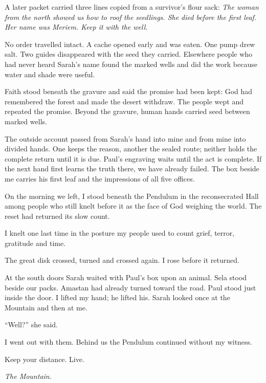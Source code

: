 A later packet carried three lines copied from a survivor's flour sack: \emph{The woman from the north showed us how to roof the seedlings. She died before the first leaf. Her name was Meriem. Keep it with the well.}\par

No order travelled intact. A cache opened early and was eaten. One pump drew salt. Two guides disappeared with the seed they carried. Elsewhere people who had never heard Sarah's name found the marked wells and did the work because water and shade were useful.\par

Faith stood beneath the gravure and said the promise had been kept: God had remembered the forest and made the desert withdraw. The people wept and repeated the promise. Beyond the gravure, human hands carried seed between marked wells.\par

\ornament

The outside account passed from Sarah's hand into mine and from mine into divided hands. One keeps the reason, another the sealed route; neither holds the complete return until it is due. Paul's engraving waits until the act is complete. If the next hand first learns the truth there, we have already failed. The box beside me carries his first leaf and the impressions of all five offices.\par

On the morning we left, I stood beneath the Pendulum in the reconsecrated Hall among people who still knelt before it as the face of God weighing the world. The reset had returned its slow count.\par

I knelt one last time in the posture my people used to count grief, terror, gratitude and time.\par

The great disk crossed, turned and crossed again. I rose before it returned.\par

At the south doors Sarah waited with Paul's box upon an animal. Sela stood beside our packs. Amastan had already turned toward the road. Paul stood just inside the door. I lifted my hand; he lifted his. Sarah looked once at the Mountain and then at me.\par

``Well?'' she said.\par

I went out with them. Behind us the Pendulum continued without my witness.\par

Keep your distance. Live.\par

\emph{The Mountain.}\par

